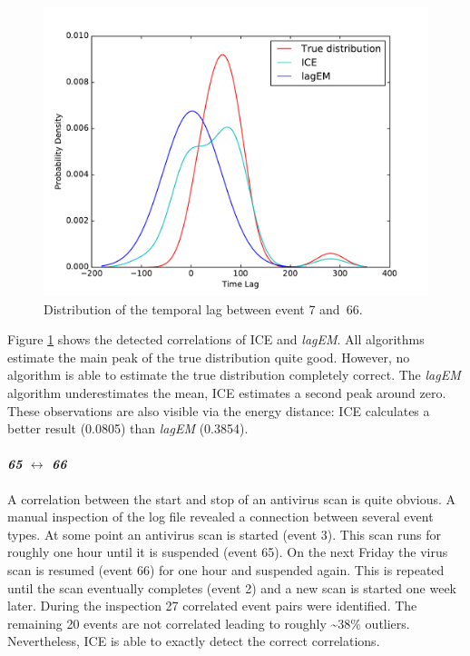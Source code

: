 \documentclass[conference]{IEEEtran}
\theoremstyle{examplestyle}
\begin{document}
\begin{figure}[!tb]
	\centering
	\includegraphics[scale=0.4]{images/symantec/7-66.pdf}
	\caption{Distribution of the temporal lag between event 7 and~66.}
	\label{fig:7-66}
\end{figure}

Figure \ref{fig:7-66} shows the detected correlations of \ac{ICE} and \textit{lagEM}. All algorithms estimate the main peak of the true distribution quite good. However, no algorithm is able to estimate the true distribution completely correct. The \textit{lagEM} algorithm underestimates the mean, \ac{ICE} estimates a second peak around zero. These observations are also visible via the energy distance: \ac{ICE} calculates a better result (0.0805) than \textit{lagEM} (0.3854).




\paragraph{\textit{65} \(\leftrightarrow\) \textit{66}} A correlation between the start and stop of an antivirus scan is quite obvious. A manual inspection of the log file revealed a connection between several event types. At some point an antivirus scan is started (event 3). This scan runs for roughly one hour until it is suspended (event 65). On the next Friday the virus scan is resumed (event 66) for one hour and suspended again. This is repeated until the scan eventually completes (event 2) and a new scan is started one week later. During the inspection 27 correlated event pairs were identified. The remaining 20 events are not correlated leading to roughly \textasciitilde 38\% outliers. Nevertheless, \ac{ICE} is able to exactly detect the correct correlations.
\end{document}
